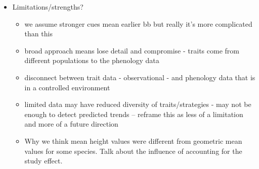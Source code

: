 \documentclass{article}\usepackage[]{graphicx}\usepackage[]{color}
\begin{document}
\begin{itemize}
\item Limitations/strengths?
	\begin{itemize}
	\item we assume stronger cues mean earlier bb but really it's more complicated than this
	\item broad approach means lose detail and compromise - traits come from different populations to the phenology data
	\item disconnect between trait data - observational - and phenology data that is in a controlled environment
	\item limited data may have reduced diversity of traits/strategies - may not be enough to detect predicted trends -- reframe this as less of a limitation and more of a future direction
   \item Why we think mean height values were different from geometric mean values for some species. Talk about the influence of accounting for the study effect. 
	\end{itemize}
\end{itemize}


\pagebreak
% 

\end{document}
